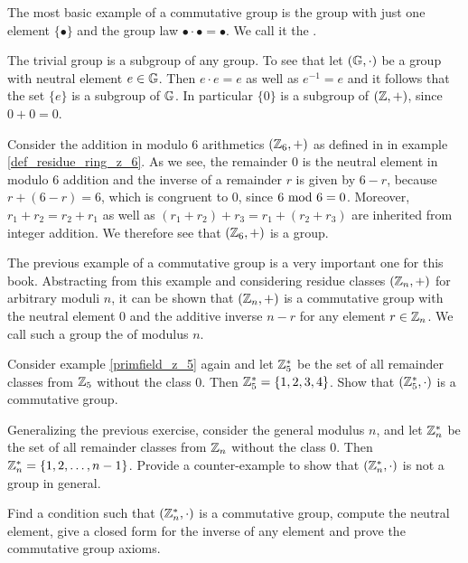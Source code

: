 \begin{example}\label{example:trivial_group}
The most basic example of a commutative group is the group with just one element $\{\bullet\}$ and the group law $\bullet\cdot \bullet=\bullet$. We call it the .

The trivial group is a subgroup of any group. To see that let $(\mathbb{G},\cdot)$ be a group with neutral element $e\in\mathbb{G}$. Then $e\cdot e = e$ as well as $e^{-1}=e$ and it follows that the set $\{e\}$ is a subgroup of $\mathbb{G}$. In particular $\{0\}$ is a subgroup of $(\mathbb{Z},+)$, since $0+0=0$.
\end{example}

\begin{example} Consider the addition in modulo $6$ arithmetics $(\mathbb{Z}_6,+)$ as defined in in example \ref{def_residue_ring_z_6}. As we see, the remainder $0$ is the neutral element in modulo $6$ addition and the inverse of a remainder $r$ is given by $6-r$, because $r+(6-r)=6$, which is congruent to $0$, since $6 \text{ mod } 6=0$. Moreover, $r_1+r_2 = r_2 + r_1$ as well as $(r_1+r_2)+r_3=r_1+(r_2+r_3)$ are inherited from integer addition. We therefore see that $(\mathbb{Z}_6,+)$ is a group.
\end{example}
The previous example of a commutative group is a very important one for this book. Abstracting from this example and considering residue classes $(\mathbb{Z}_n,+)$ for arbitrary moduli $n$, it can be shown that $(\mathbb{Z}_n,+)$ is a commutative group with the neutral element $0$ and the additive inverse $n-r$ for any element $r\in\mathbb{Z}_n$. We call such a group the  of modulus $n$.
\begin{exercise}\label{fstar} Consider example \ref{primfield_z_5} again and let $\mathbb{Z}_5^*$ be the set of all remainder classes from $\mathbb{Z}_5$ without the class $0$. Then $\mathbb{Z}_5^*=\{1,2,3,4\}$. Show that $(\mathbb{Z}_5^*,\cdot)$ is a commutative group.
\end{exercise}
\begin{exercise}\label{ex:Zn*} Generalizing the previous exercise, consider the general modulus $n$, and let $\mathbb{Z}_n^*$ be the set of all remainder classes from $\mathbb{Z}_n$ without the class $0$. Then $\mathbb{Z}_n^*=\{1,2,\ldots,n-1\}$. Provide a counter-example to show that $(\mathbb{Z}^*_n,\cdot)$ is not a group in general.

Find a condition such that $(\mathbb{Z}^*_n,\cdot)$ is a commutative group, compute the neutral element, give a closed form for the inverse of any element and prove the commutative group axioms.
\end{exercise}
